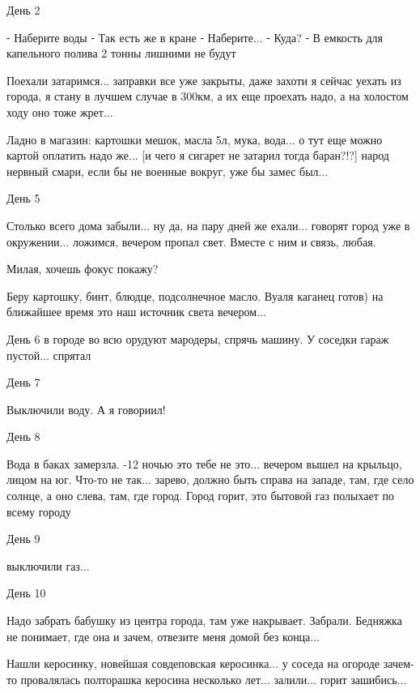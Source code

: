 
День 2

⁃ Наберите воды
⁃ Так есть же в кране
⁃ Наберите...
⁃ Куда?
⁃ В емкость для капельного полива 2 тонны лишними не будут

Поехали затаримся... заправки все уже закрыты, даже захоти я сейчас уехать из
города, я стану в лучшем случае в 300км, а их еще проехать надо, а на холостом
ходу оно тоже жрет...

Ладно в магазин: картошки мешок, масла 5л, мука, вода... о тут еще можно картой
оплатить надо же... [и чего я сигарет не затарил тогда баран?!?] народ нервный
смари, если бы не военные вокруг, уже бы замес был...


День 5

Столько всего дома забыли... ну да, на пару дней же ехали... говорят город уже в
окружении... ложимся, вечером пропал свет. Вместе с ним и связь, любая. 

Милая, хочешь фокус покажу?

Беру картошку, бинт, блюдце, подсолнечное масло. Вуаля каганец готов) на ближайшее время это наш источник света вечером...

День 6 в городе во всю орудуют мародеры, спрячь машину. У соседки гараж пустой... спрятал

День 7

Выключили воду. А я говориил!

День 8

Вода в баках замерзла. -12 ночью это тебе не это... вечером вышел на крыльцо,
лицом на юг. Что-то не так... зарево, должно быть справа на западе, там, где село
солнце, а оно слева, там, где город. Город горит, это бытовой газ полыхает по
всему городу


День 9

выключили газ...

День 10

Надо забрать бабушку из центра города, там уже накрывает. Забрали. Бедняжка не
понимает, где она и зачем, отвезите меня домой без конца...

Нашли керосинку, новейшая совдеповская керосинка... у соседа на огороде зачем-то
провалялась полторашка керосина несколько лет... залили... горит зашибись...

